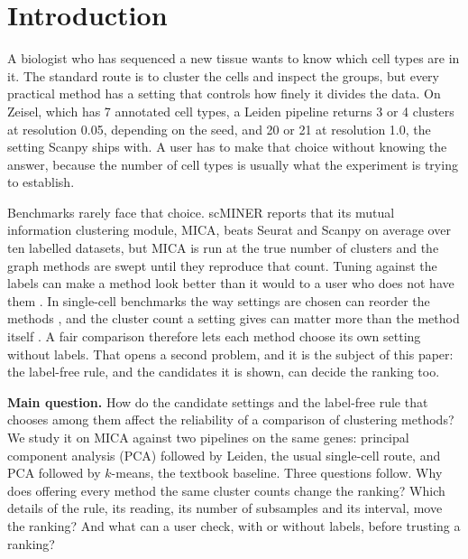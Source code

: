 \section{Introduction}\label{sec:intro}
A biologist who has sequenced a new tissue wants to know which cell types are in it. The standard
route is to cluster the cells and inspect the groups, but every practical method has a setting that
controls how finely it divides the data. On Zeisel, which has 7 annotated cell types, a Leiden
pipeline returns 3 or 4 clusters at resolution 0.05, depending on the seed, and 20 or 21 at resolution
1.0, the setting Scanpy ships with. A user has to make that choice without knowing the answer,
because the number of cell types is usually what the experiment is trying to establish.

Benchmarks rarely face that choice. scMINER \cite{pan2025scminer} reports that its mutual information
clustering module, MICA, beats Seurat and Scanpy on average over ten labelled datasets, but MICA is run
at the true number of clusters and the graph methods are swept until they reproduce that count. Tuning
against the labels can make a method look better than it would to a user who does not have them
\cite{ullmann2023overoptimistic}. In single-cell benchmarks the way settings are chosen can reorder the
methods \cite{raimundo2020tuning}, and the cluster count a setting gives can matter more than the method
itself \cite{germain2020pipecomp}. A fair comparison therefore lets each method choose its own setting
without labels. That opens a second problem, and it is the subject of this paper: the label-free rule,
and the candidates it is shown, can decide the ranking too.

\textbf{Main question.} How do the candidate settings and the label-free rule that chooses among them
affect the reliability of a comparison of clustering methods? We study it on MICA against two pipelines on
the same genes: principal component analysis (PCA) followed by Leiden, the usual single-cell route, and
PCA followed by $k$-means, the textbook baseline. Three questions follow. Why does offering every method
the same cluster counts change the ranking? Which details of the rule, its reading, its number of
subsamples and its interval, move the ranking? And what can a user check, with or without labels, before
trusting a ranking?

